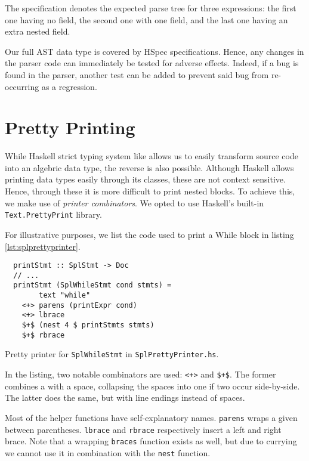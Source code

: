 The specification denotes the expected parse tree for three expressions: the first one having no field, the second one with one field, and the last one having an extra nested field.

Our full AST data type is covered by HSpec specifications.
Hence, any changes in the parser code can immediately be tested for adverse effects.
Indeed, if a bug is found in the parser, another test can be added to prevent said bug from re-occurring as a regression.

\section{Pretty Printing}

While Haskell strict typing system like allows us to easily transform source code into an algebric data type, the reverse is also possible.
Although Haskell allows printing data types easily through its  classes, these are not context sensitive.
Hence, through these it is more difficult to print nested blocks.
To achieve this, we make use of \emph{printer combinators}.
We opted to use Haskell's built-in \texttt{Text.PrettyPrint} library.

For illustrative purposes, we list the code used to print a \textsf{While} block in listing \ref{lst:splprettyprinter}.

\begin{listing}
\begin{verbatim}
  printStmt :: SplStmt -> Doc
  // ...
  printStmt (SplWhileStmt cond stmts) =
        text "while"
    <+> parens (printExpr cond)
    <+> lbrace
    $+$ (nest 4 $ printStmts stmts)
    $+$ rbrace
\end{verbatim}
\caption{Pretty printer for \texttt{SplWhileStmt} in \texttt{SplPrettyPrinter.hs}.}
\label{lst:splprettyprinter}
\end{listing}

In the listing, two notable combinators are used: \texttt{<+>} and \texttt{\$+\$}. The former combines a  with a space, collapsing the spaces into one if two occur side-by-side. The latter does the same, but with line endings instead of spaces.

Most of the helper functions have self-explanatory names.
\texttt{parens} wraps a given  between parentheses.
\texttt{lbrace} and \texttt{rbrace} respectively insert a left and right brace.
Note that a wrapping \texttt{braces} function exists as well, but due to currying we cannot use it in combination with the \texttt{nest} function.


